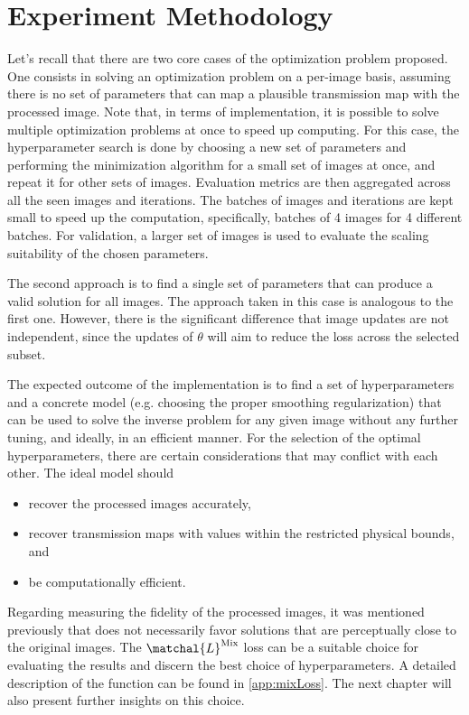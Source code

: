 \documentclass[nomenclature, english, bibtex]{kththesis}
\numberwithin{listing}{chapter}
\begin{document}
\section{Experiment Methodology}

Let's recall that there are two core cases of the optimization problem proposed. One consists in solving an optimization problem
on a per-image basis, assuming there is no set of parameters that can map a plausible transmission map with the processed image.
Note that, in terms of implementation, it is possible to solve multiple optimization problems at once to speed up computing.
For this case, the hyperparameter search is done by choosing a new set of parameters and performing the minimization algorithm
for a small set of images at once, and repeat it for other sets of images. Evaluation metrics are then aggregated across all the
seen images and iterations. The batches of images and iterations are kept small to speed up the computation, specifically,
batches of 4 images for 4 different batches. For validation, a larger set of images is used to evaluate the scaling suitability
of the chosen parameters.

The second approach is to find a single set of parameters that can produce a valid solution for all images.
The approach taken in this case is analogous to the first one. However, there is the significant difference that image
updates are not independent, since the updates of $\theta$ will aim to reduce the loss across the selected subset.

The expected outcome of the implementation is to find a set of hyperparameters and a concrete model (e.g. choosing the
proper smoothing regularization) that can be used to solve the inverse problem for any given image without any further tuning,
and ideally, in an efficient manner. For the selection of the optimal hyperparameters, there are certain considerations that may
conflict with each other. The ideal model should

\begin{itemize}
    \item recover the processed images accurately,
    \item recover transmission maps with values within the restricted physical bounds, and
    \item be computationally efficient.
\end{itemize}

Regarding measuring the fidelity of the processed images, it was mentioned previously that  does not necessarily favor
solutions that are perceptually close to the original images. The $\matchal{L}^{\text{Mix}}$ loss \cite{zhaoLossFunctionsImage2017}
can be a suitable choice for evaluating the results and discern the best choice of hyperparameters.
A detailed description of the function can be found in \autoref{app:mixLoss}. The next chapter will also present further
insights on this choice.
\end{document}
